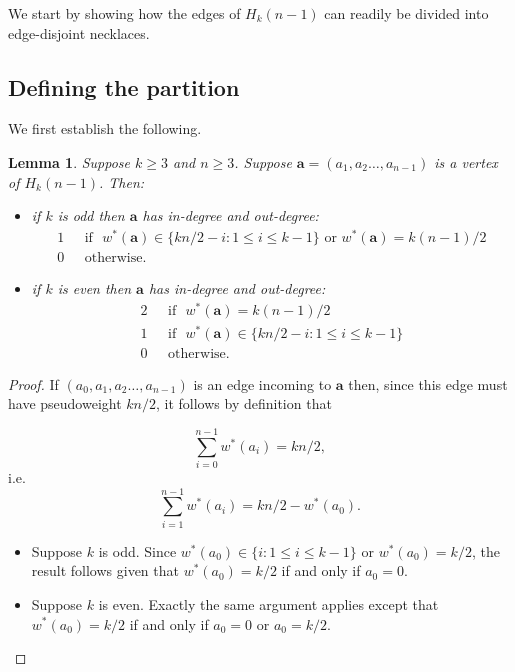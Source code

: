 \documentclass[a4paper,11pt]{article}
\theoremstyle{plain}
\newtheorem{lemma}{Lemma}[section]
\theoremstyle{definition}
\theoremstyle{remark}
\begin{document}
We start by showing how the edges of $H_k(n-1)$ can readily be divided into edge-disjoint
necklaces.

\subsection{Defining the partition}  \label{subsection:defining_Ckn-1}

We first establish the following.

\begin{lemma}  \label{lemma:k_odd_vertex_degrees}  \label{lemma:Hkn-1_vertex_degrees}
Suppose $k\geq3$ and $n\geq 3$. Suppose $\mathbf{a}=(a_1,a_2\dots,a_{n-1})$ is a vertex of
$H_k(n-1)$. Then:
\begin{itemize}
\item if $k$ is odd then $\mathbf{a}$ has in-degree and out-degree:
\begin{align*}
1 & \text{~~if~~} w^*(\mathbf{a})\in\{kn/2-i:1\leq i\leq k-1\} \text{~or~} w^*(\mathbf{a})=k(n-1)/2 \\
0 & \text{~~otherwise}.
\end{align*}
\item if $k$ is even then $\mathbf{a}$ has in-degree and out-degree:
\begin{align*}
2 & \text{~~if~~} w^*(\mathbf{a})=k(n-1)/2 \\
1 & \text{~~if~~} w^*(\mathbf{a})\in\{kn/2-i:1\leq i\leq k-1\} \\
0 & \text{~~otherwise}.
\end{align*}
\end{itemize}
\end{lemma}

\begin{proof}
If $(a_0,a_1,a_2\dots,a_{n-1})$ is an edge incoming to $\mathbf{a}$ then, since this edge must have
    pseudoweight $kn/2$, it follows by definition that

\[ \sum_{i=0}^{n-1}w^*(a_i) = kn/2, \]
i.e.\
\[ \sum_{i=1}^{n-1}w^*(a_i) = kn/2 - w^*(a_0). \]

\begin{itemize}
\item Suppose $k$ is odd. Since $w^*(a_0)\in\{i:1\leq i\leq k-1\}$ or $w^*(a_0)=k/2$, the
    result follows given that $w^*(a_0)=k/2$ if and only if $a_0=0$.
\item Suppose $k$ is even. Exactly the same argument applies except that $w^*(a_0)=k/2$ if and
    only if $a_0=0$ or $a_0=k/2$.
\end{itemize}
\end{proof}
\end{document}
